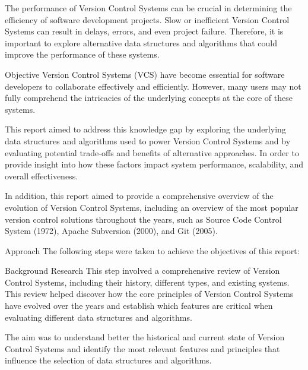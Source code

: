 \documentclass[a4paper,12pt]{article}
\makeatletter
\renewcommand{\section}{\needspace{.25\textheight} \@startsection{section}{1}{0mm}
  {\baselineskip}
  {\baselineskip}{\Large\bfseries\scshape}}
\renewcommand{\subsection}{\needspace{.15\textheight} \@startsection{subsection}{1}{0mm}
  {\baselineskip}
  {\baselineskip}{\large\bfseries\scshape}}
\makeatother
\begin{document}
The performance of Version Control Systems can be crucial in determining the efficiency of software development projects. Slow or inefficient Version Control Systems can result in delays, errors, and even project failure. Therefore, it is important to explore alternative data structures and algorithms that could improve the performance of these systems.

\section{Objective}
Version Control Systems (VCS) have become essential for software developers to collaborate effectively and efficiently. However, many users may not fully comprehend the intricacies of the underlying concepts at the core of these systems.
\vspace{9pt}

This report aimed to address this knowledge gap by exploring the underlying data structures and algorithms used to power Version Control Systems and by evaluating potential trade-offs and benefits of alternative approaches. In order to provide insight into how these factors impact system performance, scalability, and overall effectiveness.
\vspace{9pt}

In addition, this report aimed to provide a comprehensive overview of the evolution of Version Control Systems, including an overview of the most popular version control solutions throughout the years, such as Source Code Control System (1972), Apache Subversion (2000), and Git (2005).

\section{Approach}
The following steps were taken to achieve the objectives of this report:

\subsection{Background Research}
This step involved a comprehensive review of Version Control Systems, including their history, different types, and existing systems. This review helped discover how the core principles of Version Control Systems have evolved over the years and establish which features are critical when evaluating different data structures and algorithms.
\vspace{9pt}

The aim was to understand better the historical and current state of Version Control Systems and identify the most relevant features and principles that influence the selection of data structures and algorithms.
\end{document}
